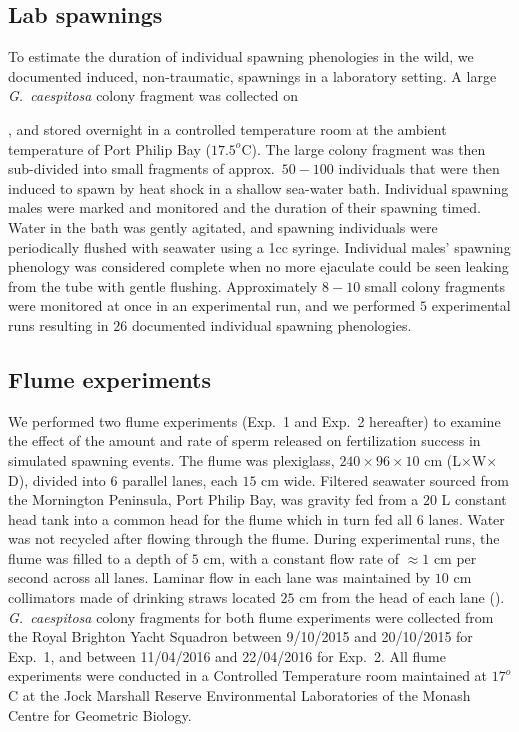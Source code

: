 \documentclass{article}
\begin{document}
	\subsection*{Lab spawnings}
	To estimate the duration of individual spawning phenologies in the wild, we documented induced, non-traumatic, spawnings in a laboratory setting. A large \textit{G.~caespitosa} colony fragment was collected on \date{16/11/16}, and stored overnight in a controlled temperature room at the ambient temperature of Port Philip Bay ($17.5^o$C). The large colony fragment was then sub-divided into small fragments of approx.~$50-100$ individuals that were then induced to spawn by heat shock in a shallow sea-water bath. Individual spawning males were marked and monitored and the duration of their spawning timed. Water in the bath was gently agitated, and spawning individuals were periodically flushed with seawater using a 1cc syringe. Individual males' spawning phenology was considered complete when no more ejaculate could be seen leaking from the tube with gentle flushing. Approximately $8-10$ small colony fragments were monitored at once in an experimental run, and we performed $5$ experimental runs resulting in $26$ documented individual spawning phenologies. 

	\subsection*{Flume experiments}
	We performed two flume experiments (Exp.~1 and Exp.~2 hereafter) to examine the effect of the amount and rate of sperm released on fertilization success in simulated spawning events. The flume was plexiglass, $240 \times 96 \times 10$ cm (L$\times$W$\times$D), divided into $6$ parallel lanes, each $15$ cm wide. Filtered seawater sourced from the Mornington Peninsula, Port Philip Bay, was gravity fed from a $20$ L constant head tank into a common head for the flume which in turn fed all $6$ lanes. Water was not recycled after flowing through the flume. During experimental runs, the flume was filled to a depth of $5$ cm, with a constant flow rate of $\approx 1$ cm per second across all lanes. Laminar flow in each lane was maintained by $10$ cm collimators made of drinking straws located $25$ cm from the head of each lane (\citealt{YundMeidel2003}). \textit{G.~caespitosa} colony fragments for both flume experiments were collected from the Royal Brighton Yacht Squadron between 9/10/2015 and 20/10/2015 for Exp.~1, and between 11/04/2016 and 22/04/2016 for Exp.~2. All flume experiments were conducted in a Controlled Temperature room maintained at $17^o$ C at the Jock Marshall Reserve Environmental Laboratories of the Monash Centre for Geometric Biology.
\end{document}
